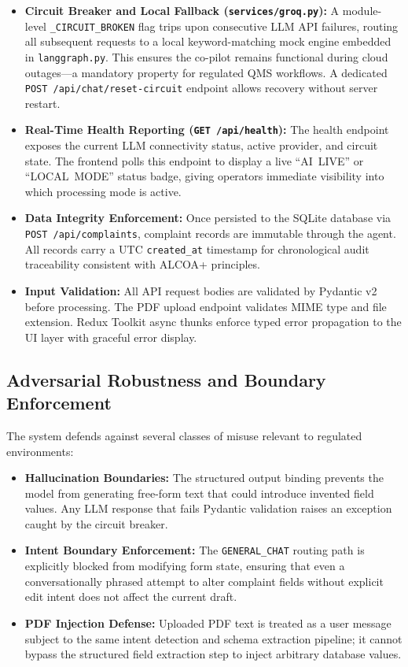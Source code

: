 \documentclass[12pt,a4paper]{report}
\begin{document}
\begin{itemize}[leftmargin=*]
\item \textbf{Circuit Breaker and Local Fallback (\texttt{services/\allowbreak groq.py}):} A module-level \texttt{\_CIRCUIT\_BROKEN} flag trips upon consecutive LLM API failures, routing all subsequent requests to a local keyword-matching mock engine embedded in \texttt{langgraph.py}. This ensures the co-pilot remains functional during cloud outages---a mandatory property for regulated QMS workflows. A dedicated \texttt{POST /api/chat/reset-circuit} endpoint allows recovery without server restart.

\item \textbf{Real-Time Health Reporting (\texttt{GET /api/health}):} The health endpoint exposes the current LLM connectivity status, active provider, and circuit state. The frontend polls this endpoint to display a live ``AI~LIVE'' or ``LOCAL~MODE'' status badge, giving operators immediate visibility into which processing mode is active.

\item \textbf{Data Integrity Enforcement:} Once persisted to the SQLite database via \texttt{POST /api/complaints}, complaint records are immutable through the agent. All records carry a UTC \texttt{created\_at} timestamp for chronological audit traceability consistent with ALCOA+ principles.

\item \textbf{Input Validation:} All API request bodies are validated by Pydantic v2 before processing. The PDF upload endpoint validates MIME type and file extension. Redux Toolkit async thunks enforce typed error propagation to the UI layer with graceful error display.
\end{itemize}

\subsection{Adversarial Robustness and Boundary Enforcement}

The system defends against several classes of misuse relevant to regulated environments:

\begin{itemize}[leftmargin=*]
\item \textbf{Hallucination Boundaries:} The structured output binding prevents the model from generating free-form text that could introduce invented field values. Any LLM response that fails Pydantic validation raises an exception caught by the circuit breaker.
\item \textbf{Intent Boundary Enforcement:} The \texttt{GENERAL\_CHAT} routing path is explicitly blocked from modifying form state, ensuring that even a conversationally phrased attempt to alter complaint fields without explicit edit intent does not affect the current draft.
\item \textbf{PDF Injection Defense:} Uploaded PDF text is treated as a user message subject to the same intent detection and schema extraction pipeline; it cannot bypass the structured field extraction step to inject arbitrary database values.
\end{itemize}
\end{document}

